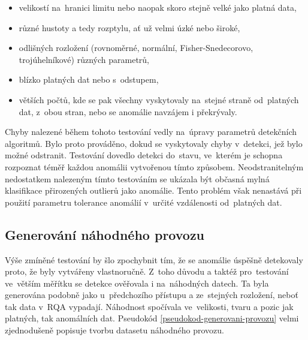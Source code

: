 \begin{itemize}
  \item velikostí na~hranici limitu nebo naopak skoro stejně velké jako platná data,
  \item různé hustoty a tedy rozptylu, ať už velmi úzké nebo široké,
  \item odlišných rozložení (rovnoměrné, normální, Fisher-Snedecorovo, trojúhelníkové) různých parametrů,
  \item blízko platných dat nebo s~odstupem,
  \item větších počtů, kde se pak všechny vyskytovaly na~stejné straně od~platných dat, z~obou stran, nebo se anomálie navzájem i překrývaly.
\end{itemize}

Chyby nalezené během tohoto testování vedly na~úpravy parametrů detekčních algoritmů. Bylo proto prováděno, dokud se vyskytovaly chyby v~detekci, jež bylo možné odstranit. Testování dovedlo detekci do~stavu, ve~kterém je schopna rozpoznat téměř každou anomálii vytvořenou tímto způsobem. Neodstranitelným nedostatkem nalezeným tímto testováním se ukázala být občasná mylná klasifikace přirozených outlierů jako anomálie. Tento problém však nenastává při použití parametru tolerance anomálií v~určité vzdálenosti od~platných dat.

\subsection{Generování náhodného provozu}
Výše zmíněné testování by šlo zpochybnit tím, že se anomálie úspěšně detekovaly proto, že byly vytvářeny vlastnoručně. Z~toho důvodu a taktéž pro~testování ve~větším měřítku se detekce ověřovala i na~náhodných datech. Ta byla generována podobně jako u~předchozího přístupu a ze~stejných rozložení, neboť tak data v~RQA vypadají. Náhodnost spočívala ve~velikosti, tvaru a pozic jak platných, tak anomálních dat. Pseudokód \ref{pseudokod-generovani-provozu} velmi zjednodušeně popisuje tvorbu datasetu náhodného provozu.

